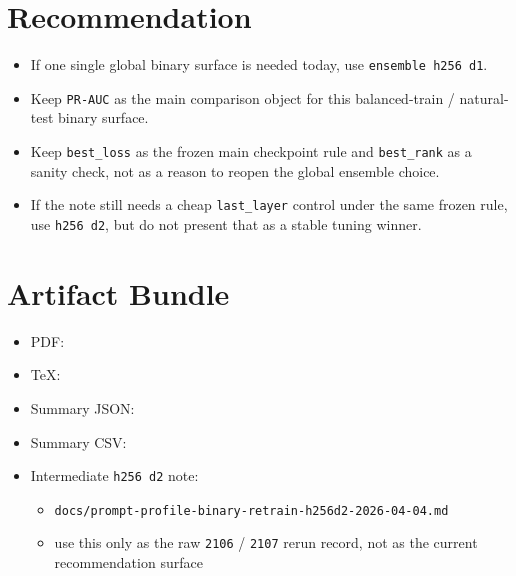 \documentclass[11pt]{article}
\begin{document}
\section*{Recommendation}
\begin{itemize}[leftmargin=1.5em]
\item If one single global binary surface is needed today, use \texttt{ensemble h256 d1}.
\item Keep \texttt{PR-AUC} as the main comparison object for this balanced-train / natural-test binary surface.
\item Keep \texttt{best\_loss} as the frozen main checkpoint rule and \texttt{best\_rank} as a sanity check, not as a reason to reopen the global ensemble choice.
\item If the note still needs a cheap \texttt{last\_layer} control under the same frozen rule, use \texttt{h256 d2}, but do not present that as a stable tuning winner.
\end{itemize}

\section*{Artifact Bundle}
\begin{itemize}[leftmargin=1.5em]
\item PDF: 
\item TeX: 
\item Summary JSON: 
\item Summary CSV: 
\item Intermediate \texttt{h256 d2} note:
  \begin{itemize}[leftmargin=1.5em]
  \item \texttt{docs/prompt-profile-binary-retrain-h256d2-2026-04-04.md}
  \item use this only as the raw \texttt{2106} / \texttt{2107} rerun record, not as the current recommendation surface
  \end{itemize}
\end{itemize}
\end{document}
